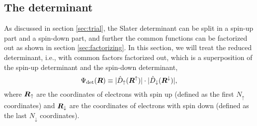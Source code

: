 \subsection{The determinant} \label{sec:slaterdeterminant}
As discussed in section \ref{sec:trial}, the Slater determinant can be split in a spin-up part and a spin-down part, and further the common functions can be factorized out as shown in section \ref{sec:factorizing}. In this section, we will treat the reduced determinant, i.e., with common factors factorized out, which is a superposition of the spin-up determinant and the spin-down determinant,
\begin{equation}
\Psi_{\text{det}}(\boldsymbol{{R}})\equiv |\hat{D}_{\uparrow}(\boldsymbol{{R}}^{\uparrow})|\cdot |\hat{D}_{\downarrow}(\boldsymbol{{R}}^{\downarrow})|,
\end{equation}
where $\boldsymbol{{R}}_{\uparrow}$ are the coordinates of electrons with spin up (defined as the first $N_{\uparrow}$ coordinates) and $\boldsymbol{{R}}_{\downarrow}$ are the coordinates of electrons with spin down (defined as the last $N_{\downarrow}$ coordinates). 

